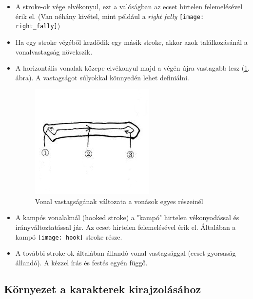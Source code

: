 \begin{itemize}
\item A stroke-ok vége elvékonyul, ezt a valóságban az ecset hirtelen felemelésével érik el. (Van néhány kivétel, mint például a \textit{right fally} \texttt{[image: right\_fally]}) 
\item Ha egy stroke végéből kezdődik egy másik stroke, akkor azok találkozásánál a vonalvastagság növekszik.
\item A horizontális vonalak közepe elvékonyul majd a végén újra vastagabb lesz (\ref{fig:vastagsag}. ábra). A vastagságot súlyokkal könnyedén lehet definiálni.

\begin{figure}
\centering
\includegraphics[scale=0.6]{images/horizontal_line}
\caption{Vonal vastagságának változata a vonások egyes részeinél}
\label{fig:vastagsag}
\end{figure}

\item A kampós vonalaknál (hooked stroke) a "kampó" hirtelen vékonyodással és irányváltoztatással jár. Az ecset hirtelen felemelésével érik el. Általában a kampó \texttt{[image: hook]} stroke része.
\item A további stroke-ok általában állandó vonal vastagsággal (ecset gyorsaság állandó). A kézzel írás és festés egyén függő.
\end{itemize}

\subsection{Környezet a karakterek kirajzolásához}

